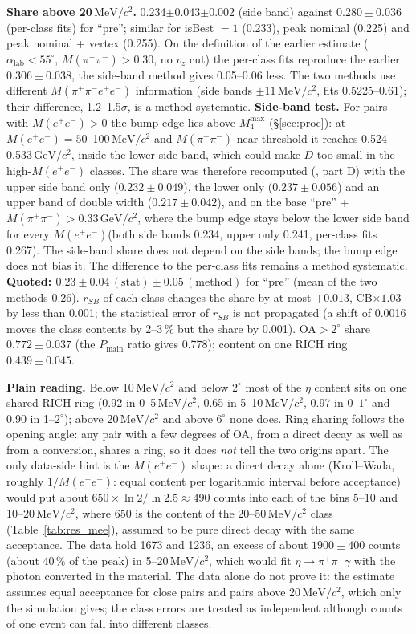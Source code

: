 \documentclass[11pt,a4paper]{article}
\newcommand{\pipi}{\ensuremath{\pi^{+}\pi^{-}}\xspace}
\newcommand{\Mfour}{\ensuremath{M(\pi^{+}\pi^{-}e^{+}e^{-})}\xspace}
\newcommand{\Mee}{\ensuremath{M(e^{+}e^{-})}\xspace}
\newcommand{\Mpipi}{\ensuremath{M(\pi^{+}\pi^{-})}\xspace}
\newcommand{\GeVcc}{\ensuremath{\mathrm{GeV}/c^{2}}\xspace}
\newcommand{\MeVcc}{\ensuremath{\mathrm{MeV}/c^{2}}\xspace}
\newcommand{\code}[1]{\texttt{\detokenize{#1}}}
\newcommand{\alab}{\ensuremath{\alpha_{\mathrm{lab}}}\xspace}
\newcommand{\Pmain}{\ensuremath{P_{\mathrm{main}}}\xspace}
\newcommand{\vz}{\ensuremath{v_z}\xspace}
\begin{document}
\textbf{Share above 20\,\MeVcc.} 0.234$\pm$0.043$\pm$0.002 (side band) against $0.280\pm0.036$ (per-class fits) for ``pre''; similar for
isBest $=1$ (0.233), peak nominal (0.225) and peak nominal + vertex (0.255). On the definition of the earlier estimate ($\alab<55^\circ$,
$\Mpipi>0.30$, no $\vz$ cut) the per-class fits reproduce the earlier $0.306\pm0.038$, the side-band method gives 0.05--0.06 less. The two
methods use different \Mfour information (side bands $\pm11$\,\MeVcc, fits 0.5225--0.61); their difference, 1.2--1.5$\sigma$, is a method
systematic. \textbf{Side-band test.} For pairs with $\Mee>0$ the bump edge lies above $M_4^{\max}$ (\S\ref{sec:proc}): at
$\Mee=50$--100\,\MeVcc and \Mpipi near threshold it reaches 0.524--0.533\,\GeVcc, inside the lower side band, which could make
$D$ too small in the high-\Mee classes. The share was therefore recomputed (\code{fix_checks.txt}, part D) with the upper side band
only ($0.232\pm0.049$), the lower only ($0.237\pm0.056$) and an upper band of double width ($0.217\pm0.042$), and on the base
``pre'' + $\Mpipi>0.33$\,\GeVcc, where the bump edge stays below the lower side band for every \Mee (both side bands 0.234, upper only
0.241, per-class fits 0.267). The side-band share does not depend on the side bands; the bump edge does not bias it. The difference
to the per-class fits remains a method systematic. \textbf{Quoted: $0.23\pm0.04\,(\mathrm{stat})\pm0.05\,(\mathrm{method})$} for
``pre'' (mean of the two methods 0.26). $r_{SB}$ of each class changes the share by at
most $+0.013$, CB$\times1.03$ by less than 0.001; the statistical error of $r_{SB}$ is not propagated (a shift of 0.0016 moves the class
contents by 2--3\,\% but the share by 0.001). OA$>2^\circ$ share $0.772\pm0.037$ (the \Pmain ratio gives 0.778); content on one RICH ring
$0.439\pm0.045$.

\textbf{Plain reading.} Below 10\,\MeVcc and below $2^\circ$ most of the $\eta$ content sits on one shared RICH ring (0.92 in 0--5\,\MeVcc, 0.65
in 5--10\,\MeVcc, 0.97 in 0--$1^\circ$ and 0.90 in 1--$2^\circ$); above 20\,\MeVcc and above $6^\circ$ none does. Ring sharing follows the
opening angle: any pair with a few degrees of OA, from a direct decay as well as from a conversion, shares a ring, so it does \emph{not}
tell the two origins apart. The only data-side hint is the \Mee shape: a direct decay alone (Kroll--Wada, roughly $1/\Mee$: equal content
per logarithmic interval before acceptance) would put about $650\times\ln2/\ln2.5\approx490$ counts into each of the bins 5--10 and
10--20\,\MeVcc, where 650 is the content of the 20--50\,\MeVcc class (Table~\ref{tab:res_mee}), assumed to be pure direct decay with the
same acceptance. The data hold 1673 and 1236, an excess of about $1900\pm400$ counts (about 40\,\% of the peak) in 5--20\,\MeVcc, which
would fit $\eta\to\pipi\gamma$ with the photon converted in the material. The data alone do not prove it: the estimate assumes equal
acceptance for close pairs and pairs above 20\,\MeVcc, which only the simulation gives; the class errors are treated as independent
although counts of one event can fall into different classes.
\end{document}
